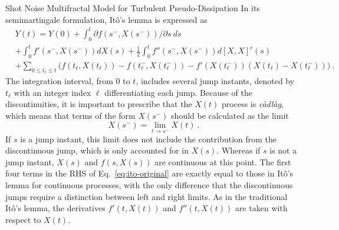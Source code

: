 \begin{chapter}{Shot Noise Multifractal Model for Turbulent Pseudo-Dissipation}
In its semimartingale formulation, It\^{o}'s lemma is expressed as
\begin{equation} \label{eq:ito-original}
    \begin{split}
    &Y(t) = Y(0) +
    \int_0^t \partial f(s^-,X(s^-)) / \partial s \ ds \\
    &+ \int_0^t f'(s^-,X(s^-)) dX(s) + \frac12 \int_0^t f''(s^-,X(s^-)) d[X,X]^c(s) \\
    &+ \sum_{0 \leq t_{\ell} \leq t} \Big( f(t_{\ell},X(t_{\ell})) - f(t_{\ell}^-,X(t_{\ell}^-))
    - f'(X(t_{\ell}^-)) (X(t_{\ell}) - X(t_{\ell}^-)) \Big) \ .
    \end{split}
\end{equation}
The integration interval, from $0$ to $t$, includes several jump instants, denoted by $t_{\ell}$ with an integer index $\ell$ differentiating each jump. Because of the discontinuities, it is important to prescribe that the $X(t)$ process is \textit{c\`{a}dl\`{a}g}, which means that terms of the form $X(s^-)$ should be calculated as the limit
\begin{equation}
    X(s^-) = \lim_{t \to s^-} X(t) \ .
\end{equation}
If $s$ is a jump instant, this limit does not include the contribution from the discontinuous jump, which is only accounted for in $X(s)$. Whereas if $s$ is not a jump instant, $X(s)$ and $f(s,X(s))$ are continuous at this point.
The first four terms in the RHS of Eq.~\eqref{eq:ito-original} are exactly equal to those in It\^{o}'s lemma for continuous processes, with the only difference that the discontinuous jumps require a distinction between left and right limits. As in the traditional It\^{o}'s lemma, the derivatives $f'(t,X(t))$ and $f''(t,X(t))$ are taken with respect to $X(t)$.


\end{chapter}
